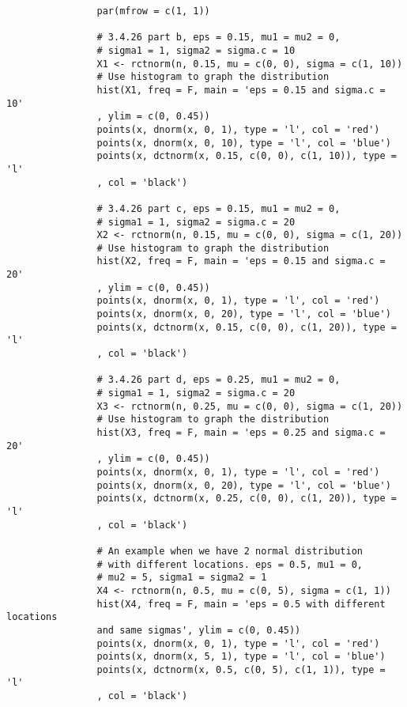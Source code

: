\begin{enumerate}
\begin{itemize}
\begin{verbatim}
				par(mfrow = c(1, 1))
				
				# 3.4.26 part b, eps = 0.15, mu1 = mu2 = 0, 
				# sigma1 = 1, sigma2 = sigma.c = 10
				X1 <- rctnorm(n, 0.15, mu = c(0, 0), sigma = c(1, 10))
				# Use histogram to graph the distribution
				hist(X1, freq = F, main = 'eps = 0.15 and sigma.c = 10'
				, ylim = c(0, 0.45))
				points(x, dnorm(x, 0, 1), type = 'l', col = 'red')
				points(x, dnorm(x, 0, 10), type = 'l', col = 'blue')
				points(x, dctnorm(x, 0.15, c(0, 0), c(1, 10)), type = 'l'
				, col = 'black')
				
				# 3.4.26 part c, eps = 0.15, mu1 = mu2 = 0, 
				# sigma1 = 1, sigma2 = sigma.c = 20
				X2 <- rctnorm(n, 0.15, mu = c(0, 0), sigma = c(1, 20))
				# Use histogram to graph the distribution
				hist(X2, freq = F, main = 'eps = 0.15 and sigma.c = 20'
				, ylim = c(0, 0.45))
				points(x, dnorm(x, 0, 1), type = 'l', col = 'red')
				points(x, dnorm(x, 0, 20), type = 'l', col = 'blue')
				points(x, dctnorm(x, 0.15, c(0, 0), c(1, 20)), type = 'l'
				, col = 'black')
				
				# 3.4.26 part d, eps = 0.25, mu1 = mu2 = 0, 
				# sigma1 = 1, sigma2 = sigma.c = 20
				X3 <- rctnorm(n, 0.25, mu = c(0, 0), sigma = c(1, 20))
				# Use histogram to graph the distribution
				hist(X3, freq = F, main = 'eps = 0.25 and sigma.c = 20'
				, ylim = c(0, 0.45))
				points(x, dnorm(x, 0, 1), type = 'l', col = 'red')
				points(x, dnorm(x, 0, 20), type = 'l', col = 'blue')
				points(x, dctnorm(x, 0.25, c(0, 0), c(1, 20)), type = 'l'
				, col = 'black')
				
				# An example when we have 2 normal distribution 
				# with different locations. eps = 0.5, mu1 = 0, 
				# mu2 = 5, sigma1 = sigma2 = 1
				X4 <- rctnorm(n, 0.5, mu = c(0, 5), sigma = c(1, 1)) 
				hist(X4, freq = F, main = 'eps = 0.5 with different locations 
				and same sigmas', ylim = c(0, 0.45))
				points(x, dnorm(x, 0, 1), type = 'l', col = 'red')
				points(x, dnorm(x, 5, 1), type = 'l', col = 'blue')
				points(x, dctnorm(x, 0.5, c(0, 5), c(1, 1)), type = 'l'
				, col = 'black')
				

\end{verbatim}
\end{itemize}
\end{enumerate}
